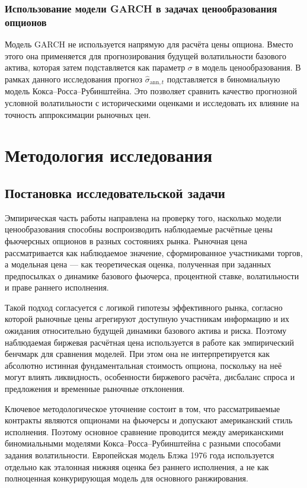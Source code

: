 \documentclass[11pt,a4paper]{article}
\begin{document}
\subsubsection{Использование модели GARCH в задачах ценообразования опционов}

Модель GARCH не используется напрямую для расчёта цены опциона. Вместо этого она применяется для прогнозирования будущей волатильности базового актива, которая затем подставляется как параметр $\sigma$ в модель ценообразования. В рамках данного исследования прогноз $\hat{\sigma}_{\text{ann},t}$ подставляется в биномиальную модель Кокса--Росса--Рубинштейна. Это позволяет сравнить качество прогнозной условной волатильности с историческими оценками и исследовать их влияние на точность аппроксимации рыночных цен.






\section{Методология исследования}

\subsection{Постановка исследовательской задачи}

Эмпирическая часть работы направлена на проверку того, насколько модели ценообразования способны воспроизводить наблюдаемые расчётные цены фьючерсных опционов в разных состояниях рынка. Рыночная цена рассматривается как наблюдаемое значение, сформированное участниками торгов, а модельная цена --- как теоретическая оценка, полученная при заданных предпосылках о динамике базового фьючерса, процентной ставке, волатильности и праве раннего исполнения.

Такой подход согласуется с логикой гипотезы эффективного рынка, согласно которой рыночные цены агрегируют доступную участникам информацию и их ожидания относительно будущей динамики базового актива и риска. Поэтому наблюдаемая биржевая расчётная цена используется в работе как эмпирический бенчмарк для сравнения моделей. При этом она не интерпретируется как абсолютно истинная фундаментальная стоимость опциона, поскольку на неё могут влиять ликвидность, особенности биржевого расчёта, дисбаланс спроса и предложения и временные рыночные отклонения.

Ключевое методологическое уточнение состоит в том, что рассматриваемые контракты являются опционами на фьючерсы и допускают американский стиль исполнения. Поэтому основное сравнение проводится между американскими биномиальными моделями Кокса--Росса--Рубинштейна с разными способами задания волатильности. Европейская модель Блэка 1976 года используется отдельно как эталонная нижняя оценка без раннего исполнения, а не как полноценная конкурирующая модель для основного ранжирования.
\end{document}
